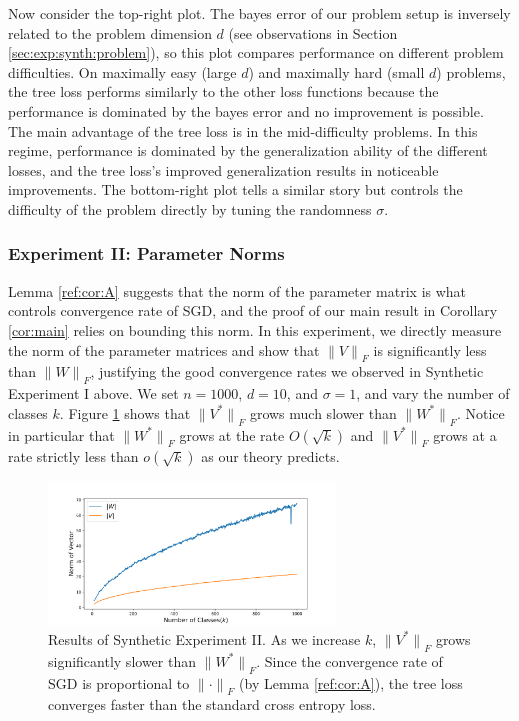 \documentclass[twoside]{article}
\renewcommand{\star}[1]{{#1}^{*}}
\newcommand{\lF}[1]{{\lVert {#1} \rVert}_F}
\begin{document}
Now consider the top-right plot.
The bayes error of our problem setup is inversely related to the problem dimension $d$ (see observations in Section \ref{sec:exp:synth:problem}),
so this plot compares performance on different problem difficulties.
On maximally easy (large $d$) and maximally hard (small $d$) problems,
the tree loss performs similarly to the other loss functions because the performance is dominated by the bayes error and no improvement is possible.
The main advantage of the tree loss is in the mid-difficulty problems.
In this regime, performance is dominated by the generalization ability of the different losses,
and the tree loss's improved generalization results in noticeable improvements.
The bottom-right plot tells a similar story but controls the difficulty of the problem directly by tuning the randomness $\sigma$.

\subsubsection{Experiment II: Parameter Norms}

Lemma \ref{ref:cor:A} suggests that the norm of the parameter matrix is what controls convergence rate of SGD,
and the proof of our main result in Corollary \ref{cor:main} relies on bounding this norm.
In this experiment, we directly measure the norm of the parameter matrices and show that $\lF{V}$ is significantly less than $\lF{W}$,
justifying the good convergence rates we observed in Synthetic Experiment I above.
We set $n=1000$, $d=10$, and $\sigma=1$, and vary the number of classes $k$.
Figure \ref{fig:synth:norm} shows that $\lF{\star V}$ grows much slower than $\lF{\star W}$.
Notice in particular that $\lF{\star W}$ grows at the rate $O(\sqrt{k})$ and $\lF{\star V}$ grows at a rate strictly less than $o(\sqrt{k})$ as our theory predicts.

\begin{figure}
\includegraphics[width=\columnwidth,height=1.5in]{fig/images/class_v_norm.png}
\caption{
    Results of Synthetic Experiment II.
    As we increase $k$,
    $\lF{\star V}$ grows significantly slower than $\lF{\star W}$.
    Since the convergence rate of SGD is proportional to $\lF{\cdot}$ (by Lemma \ref{ref:cor:A}),
    the tree loss converges faster than the standard cross entropy loss. 
    }
\label{fig:synth:norm}
\end{figure}
\end{document}
